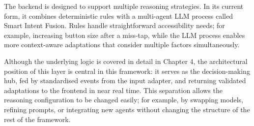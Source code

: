 \documentclass[openany]{book}
\begin{document}
The backend is designed to support multiple reasoning strategies. In its current form, it combines deterministic rules with a multi-agent LLM process called Smart Intent Fusion. Rules handle straightforward accessibility needs; for example, increasing button size after a miss-tap, while the LLM process enables more context-aware adaptations that consider multiple factors simultaneously.

Although the underlying logic is covered in detail in Chapter 4, the architectural position of this layer is central in this framework: it serves as the decision-making hub, fed by standardised events from the input adapter, and returning validated adaptations to the frontend in near real time. This separation allows the reasoning configuration to be changed easily; for example, by swapping models, refining prompts, or integrating new agents without changing the structure of the rest of the framework.

\end{document}
